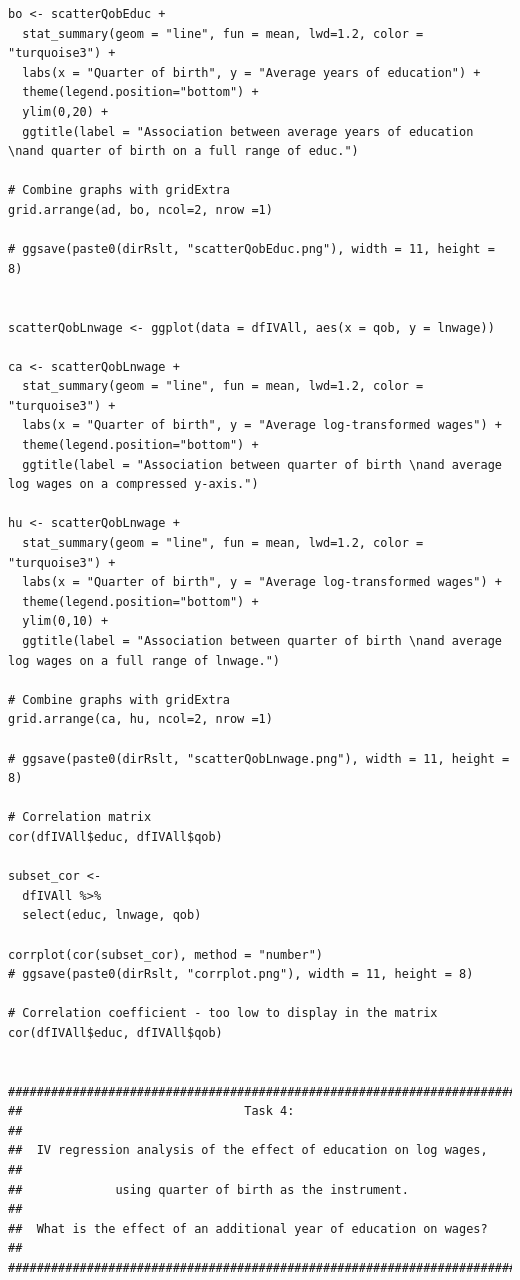\documentclass{article}
\begin{document}
\begin{tiny}
\begin{verbatim}
bo <- scatterQobEduc +
  stat_summary(geom = "line", fun = mean, lwd=1.2, color = "turquoise3") +
  labs(x = "Quarter of birth", y = "Average years of education") +
  theme(legend.position="bottom") +
  ylim(0,20) +
  ggtitle(label = "Association between average years of education \nand quarter of birth on a full range of educ.")

# Combine graphs with gridExtra
grid.arrange(ad, bo, ncol=2, nrow =1)

# ggsave(paste0(dirRslt, "scatterQobEduc.png"), width = 11, height = 8)


scatterQobLnwage <- ggplot(data = dfIVAll, aes(x = qob, y = lnwage))

ca <- scatterQobLnwage +
  stat_summary(geom = "line", fun = mean, lwd=1.2, color = "turquoise3") +
  labs(x = "Quarter of birth", y = "Average log-transformed wages") +
  theme(legend.position="bottom") +
  ggtitle(label = "Association between quarter of birth \nand average log wages on a compressed y-axis.")

hu <- scatterQobLnwage +
  stat_summary(geom = "line", fun = mean, lwd=1.2, color = "turquoise3") +
  labs(x = "Quarter of birth", y = "Average log-transformed wages") +
  theme(legend.position="bottom") +
  ylim(0,10) +
  ggtitle(label = "Association between quarter of birth \nand average log wages on a full range of lnwage.")

# Combine graphs with gridExtra
grid.arrange(ca, hu, ncol=2, nrow =1)

# ggsave(paste0(dirRslt, "scatterQobLnwage.png"), width = 11, height = 8)

# Correlation matrix
cor(dfIVAll$educ, dfIVAll$qob)

subset_cor <- 
  dfIVAll %>%
  select(educ, lnwage, qob)

corrplot(cor(subset_cor), method = "number")
# ggsave(paste0(dirRslt, "corrplot.png"), width = 11, height = 8)

# Correlation coefficient - too low to display in the matrix
cor(dfIVAll$educ, dfIVAll$qob)


#######################################################################
##                               Task 4:                             ## 
##  IV regression analysis of the effect of education on log wages,  ##
##             using quarter of birth as the instrument.             ##
##  What is the effect of an additional year of education on wages?  ##
#######################################################################


\end{verbatim}
\end{tiny}
\end{document}
